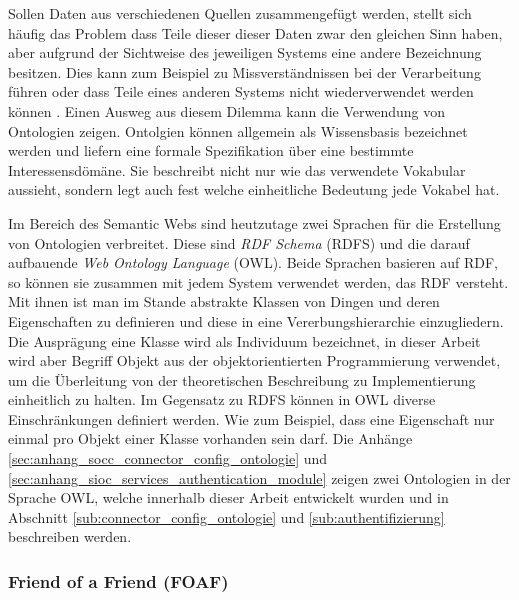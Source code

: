 Sollen Daten aus verschiedenen Quellen zusammengefügt werden, stellt sich häufig das Problem dass Teile dieser dieser Daten zwar den gleichen Sinn haben, aber aufgrund der Sichtweise des jeweiligen Systems eine andere Bezeichnung besitzen. Dies kann zum Beispiel zu Missverständnissen bei der Verarbeitung führen oder dass Teile eines anderen Systems nicht wiederverwendet werden können \cite[S.\,13]{Uschold1996a}. Einen Ausweg aus diesem Dilemma kann die Verwendung von Ontologien zeigen. Ontolgien können allgemein als Wissensbasis \cite[S.\,2]{Uschold1996a}\cite[S.\,12]{Hitzler2008a} bezeichnet werden und liefern eine formale Spezifikation über eine bestimmte Interessensdömäne. Sie beschreibt nicht nur wie das verwendete Vokabular aussieht, sondern legt auch fest welche einheitliche Bedeutung jede Vokabel hat. 

Im Bereich des Semantic Webs sind heutzutage zwei Sprachen für die Erstellung von Ontologien verbreitet. Diese sind \emph{RDF Schema} (RDFS)\cite{Brickley} und die darauf aufbauende \emph{Web Ontology Language} (OWL)\cite{partelschneider2004}. Beide Sprachen basieren auf RDF, so können sie zusammen mit jedem System verwendet werden, das RDF versteht. Mit ihnen ist man im Stande abstrakte Klassen von Dingen und deren Eigenschaften zu definieren und diese in eine Vererbungshierarchie einzugliedern. Die Ausprägung eine Klasse wird als Individuum bezeichnet, in dieser Arbeit wird aber Begriff Objekt aus der objektorientierten Programmierung verwendet, um die Überleitung von der theoretischen Beschreibung zu Implementierung einheitlich zu halten. Im Gegensatz zu RDFS können in OWL diverse Einschränkungen definiert werden. Wie zum Beispiel, dass eine Eigenschaft nur einmal pro Objekt einer Klasse vorhanden sein darf. Die Anhänge \ref{sec:anhang_socc_connector_config_ontologie} und \ref{sec:anhang_sioc_services_authentication_module} zeigen zwei Ontologien in der Sprache OWL, welche innerhalb dieser Arbeit entwickelt wurden und in Abschnitt \ref{sub:connector_config_ontologie} und \ref{sub:authentifizierung} beschreiben werden.

\subsubsection{Friend of a Friend (FOAF)} %
\label{ssub:friend_of_a_friend_}


